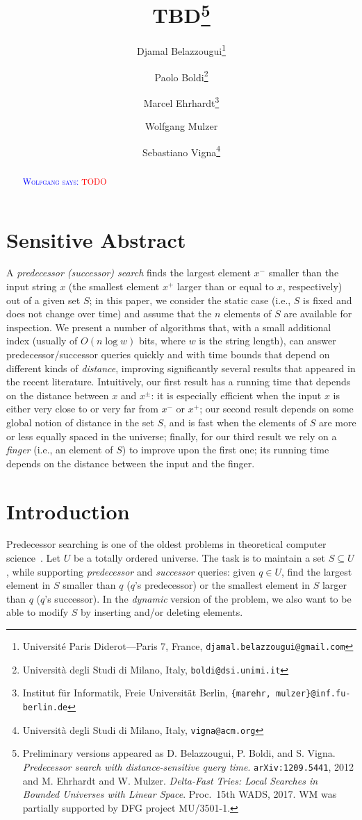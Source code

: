 \documentclass[a4paper,11pt]{article}
\title{TBD\footnote{
Preliminary versions appeared as 
D. Belazzougui, P. Boldi, and S. Vigna. 
\emph{Predecessor search with distance-sensitive query
time}. \texttt{arXiv:1209.5441}, 2012
and 
M. Ehrhardt and W. Mulzer.  \emph{Delta-Fast Tries: Local 
Searches in Bounded Universes with Linear Space}. Proc.~15th WADS,
2017.  WM was partially 
supported by DFG project MU/3501-1.}}
\author{Djamal Belazzougui\thanks{Universit\'e Paris 
        Diderot---Paris 7, France,
        \texttt{djamal.belazzougui@gmail.com}}
        \and
        Paolo Boldi\thanks{Universit\`a degli Studi di Milano, Italy, 
	\texttt{boldi@dsi.unimi.it}}
        \and
        Marcel Ehrhardt\thanks{Institut f\"ur Informatik, Freie 
	Universit\"at Berlin,
        \texttt{\{marehr, mulzer\}@inf.fu-berlin.de}}
        \and 
        Wolfgang Mulzer\footnotemark[4]
        \and 
        Sebastiano Vigna\thanks{Universit\`a 
	degli Studi di Milano, Italy, 
	\texttt{vigna@acm.org}}
        }
\date{}
\newcommand{\?}{\mskip1.5mu}
\newcommand{\aremark}[3]{\textcolor{blue}{\textsc{#1 #2:}}
  \textcolor{red}{\textsf{#3}}}
\newcommand{\wolfgang}[2][says]{\aremark{Wolfgang}{#1}{#2}}
\begin{document}
\maketitle

\begin{abstract}
\wolfgang{TODO}
\end{abstract}

\section{Sensitive Abstract}
A \emph{predecessor (successor) search} finds the largest element $x^-$ smaller
than the input string $x$ (the smallest element $x^+$ larger than or equal to
$x$, respectively) out of a given set $S$; in this paper, we consider
the static case (i.e., $S$ is fixed and does not change over time) and assume that
the $n$ elements of $S$ are available for inspection. We present a number of
algorithms that, with a small additional index (usually of $O(n\log w)$ bits,
where $w$ is the string length), can answer predecessor/successor queries
quickly and with time bounds that depend on different kinds of \emph{distance},
improving significantly several results that appeared in the recent literature.
Intuitively, our first result has a running time that depends on the distance
between $x$ and $x^\pm$: it is especially efficient when the input $x$ is
either very close to or very far from $x^-$ or $x^+$; our second result depends on some global notion of distance in the set $S$,
and is fast when the elements of $S$ are more or less equally spaced in the universe; finally, for our third result
we rely on a \emph{finger} (i.e., an element of $S$) to improve upon the first
one; its running time depends on the distance between the input and the
finger.

\section{Introduction}

Predecessor searching is one of the oldest problems in 
theoretical computer science~\cite{CormenLeRiSt09,Knuth98}.
Let $U$ be a totally ordered universe. The task
is to maintain a set $S \subseteq U$,
while supporting
\emph{predecessor} and \emph{successor} queries: 
given $q \in U$, find the largest element in $S$ 
smaller than $q$ ($q$'s predecessor) or the 
smallest element in $S$ larger than $q$
($q$'s successor). In the \emph{dynamic}
version of the problem, we also want to 
be able to modify $S$ by inserting and/or 
deleting elements.
\end{document}
